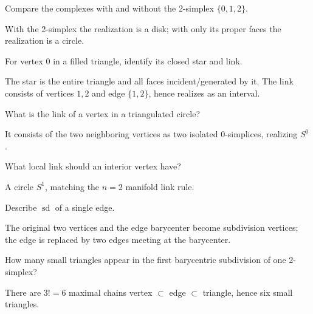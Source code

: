 \begin{problem}\label{prob:viii15-07}
Compare the complexes with and without the 2-simplex \(\{0,1,2\}\).
\end{problem}
\begin{solution}
With the 2-simplex the realization is a disk; with only its proper faces the realization is a circle.
\end{solution}

\begin{problem}\label{prob:viii15-08}
For vertex \(0\) in a filled triangle, identify its closed star and link.
\end{problem}
\begin{solution}
The star is the entire triangle and all faces incident/generated by it. The link consists of vertices \(1,2\) and edge \(\{1,2\}\), hence realizes as an interval.
\end{solution}

\begin{problem}\label{prob:viii15-09}
What is the link of a vertex in a triangulated circle?
\end{problem}
\begin{solution}
It consists of the two neighboring vertices as two isolated \(0\)-simplices, realizing \(S^0\).
\end{solution}

\begin{problem}\label{prob:viii15-10}
What local link should an interior vertex have?
\end{problem}
\begin{solution}
A circle \(S^1\), matching the \(n=2\) manifold link rule.
\end{solution}

\begin{problem}\label{prob:viii15-11}
Describe \(\operatorname{sd}\) of a single edge.
\end{problem}
\begin{solution}
The original two vertices and the edge barycenter become subdivision vertices; the edge is replaced by two edges meeting at the barycenter.
\end{solution}

\begin{problem}\label{prob:viii15-12}
How many small triangles appear in the first barycentric subdivision of one 2-simplex?
\end{problem}
\begin{solution}
There are \(3!=6\) maximal chains vertex \(\subset\) edge \(\subset\) triangle, hence six small triangles.
\end{solution}

